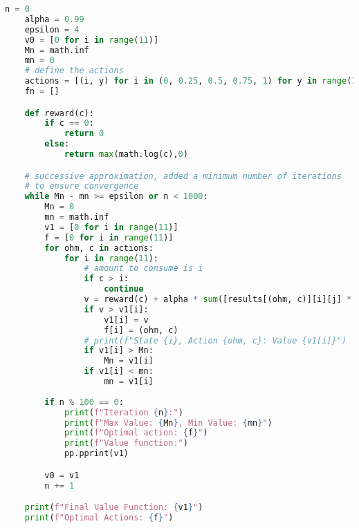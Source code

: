 \documentclass[12pt]{article}
\begin{document}
\begin{lstlisting}[language=Python,
    basicstyle=\ttfamily\tiny,
    caption=Python Implementation of Transition Probabilities, 
    backgroundcolor=\color{gray!10},
    commentstyle=\color{codegreen},
    keywordstyle=\color{magenta}]
    n = 0
    alpha = 0.99
    epsilon = 4
    v0 = [0 for i in range(11)]
    Mn = math.inf
    mn = 0
    # define the actions
    actions = [(i, y) for i in (0, 0.25, 0.5, 0.75, 1) for y in range(11)]
    fn = []

    def reward(c):
        if c == 0:
            return 0
        else:
            return max(math.log(c),0)

    # successive approximation, added a minimum number of iterations
    # to ensure convergence
    while Mn - mn >= epsilon or n < 1000:
        Mn = 0
        mn = math.inf
        v1 = [0 for i in range(11)]
        f = [0 for i in range(11)]
        for ohm, c in actions:
            for i in range(11):
                # amount to consume is i
                if c > i:
                    continue
                v = reward(c) + alpha * sum([results[(ohm, c)][i][j] * v0[j] for j in range(11)])
                if v > v1[i]:
                    v1[i] = v
                    f[i] = (ohm, c)
                # print(f"State {i}, Action {ohm, c}: Value {v1[i]}")
                if v1[i] > Mn:
                    Mn = v1[i]
                if v1[i] < mn:
                    mn = v1[i]
        
        if n % 100 == 0:
            print(f"Iteration {n}:")
            print(f"Max Value: {Mn}, Min Value: {mn}")
            print(f"Optimal action: {f}")
            print(f"Value function:")
            pp.pprint(v1)

        v0 = v1
        n += 1

    print(f"Final Value Function: {v1}")
    print(f"Optimal Actions: {f}")


    
\end{lstlisting}
\end{document}

